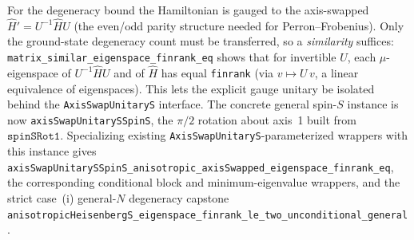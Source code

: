 \documentclass[a4paper,11pt]{article}
\begin{document}
For the degeneracy bound the Hamiltonian is gauged to the axis-swapped
\(\hat H'=U^{-1}\hat HU\) (the even/odd parity structure needed for
Perron--Frobenius).  Only the ground-state degeneracy count must be
transferred, so a \emph{similarity} suffices:
\texttt{matrix\_similar\_eigenspace\_finrank\_eq} shows that for invertible
\(U\), each \(\mu\)-eigenspace of \(U^{-1}\hat HU\) and of \(\hat H\) has equal
\texttt{finrank} (via \(v\mapsto U\,v\), a linear equivalence of eigenspaces).
This lets the explicit gauge unitary be isolated behind the
\texttt{AxisSwapUnitaryS} interface.  The concrete general spin-\(S\)
instance is now \texttt{axisSwapUnitarySSpinS}, the \(\pi/2\) rotation about
axis~1 built from \(\texttt{spinSRot1}\).  Specializing existing
\texttt{AxisSwapUnitaryS}-parameterized wrappers with this instance gives
\texttt{axisSwapUnitarySSpinS\_anisotropic\_axisSwapped\_eigenspace\_finrank\_eq},
the corresponding conditional block and minimum-eigenvalue wrappers, and the
strict case~(i) general-\(N\) degeneracy capstone
\texttt{anisotropicHeisenbergS\_eigenspace\_finrank\_le\_two\_unconditional\_general}.
\end{document}
